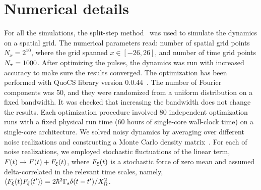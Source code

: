 \documentclass[reprint,prx,footinbib,floatfix,twocolumn,longbibliography,superscriptaddress]{revtex4-2}
\begin{document}
\section{Numerical details}
\label{appD}
For all the simulations, the split-step method~\cite{Leforestier1991a} was used to simulate the dynamics on a spatial grid.
The numerical parameters read: number of spatial grid points $N_x = 2^{10}$, where the grid spanned $x \in [-26,26]$, and number of time grid points $N_\tau = 1000$.
After optimizing the pulses, the dynamics was run with increased accuracy to make sure the results converged.
The optimization has been performed with QuoCS library version 0.0.44~\cite{Rossignolo2023}.
The number of Fourier components was 50, and they were randomized from a uniform distribution on a fixed bandwidth.
It was checked that increasing the bandwidth does not change the results.
Each optimization procedure involved 80 independent optimization runs with a fixed physical run time (60 hours of single-core wall-clock time) on a single-core architecture.
We solved noisy dynamics by averaging over different noise realizations and constructing a Monte Carlo density matrix~\cite{Molmer1993}.
For each of noise realizations, we employed stochastic fluctuations of the linear term, $F(t) \rightarrow F(t) + F_\xi(t)$, where $F_\xi(t)$ is a stochastic force of zero mean and assumed delta-correlated in the relevant time scales, namely, $\left\langle F_\xi(t) F_\xi(t') \right\rangle = 2 \hbar^2 \Gamma_{\text{s}} \delta(t-t') / X_{\Omega}^2$.
\end{document}
